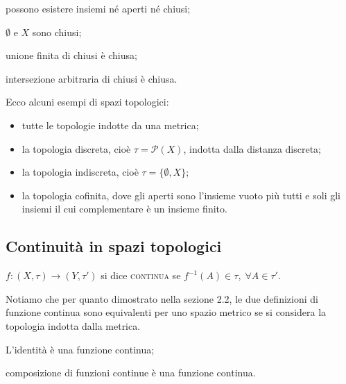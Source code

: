 \documentclass{article}
\begin{document}
\begin{oss}
\begin{nlist}
\item possono esistere insiemi né aperti né chiusi;
\item $\emptyset$ e $X$ sono chiusi;
\item unione finita di chiusi è chiusa;
\item intersezione arbitraria di chiusi è chiusa.
\end{nlist}
\end{oss}

\begin{ex}
Ecco alcuni esempi di spazi topologici:
\begin{itemize}
\item tutte le topologie indotte da una metrica;
\item la topologia discreta, cioè $\tau=\mathcal{P}(X)$, indotta dalla distanza
discreta;
\item la topologia indiscreta, cioè $\tau=\{ \emptyset, X \}$;
\item la topologia cofinita, dove gli aperti sono l'insieme vuoto più tutti e
soli gli insiemi il cui complementare è un insieme finito.
\end{itemize}
\end{ex}

\subsection{Continuità in spazi topologici}

\begin{defn}
$f: (X, \tau) \rightarrow (Y, \tau')$ si dice \textsc{continua} se ${f^{-1}(A)
\in \tau,}\; {\forall A \in \tau'}$.
\end{defn}

Notiamo che per quanto dimostrato nella sezione 2.2, le due definizioni di
funzione continua sono equivalenti per uno spazio metrico se si considera la
topologia indotta dalla metrica.

\begin{thm}
\begin{nlist}
\item L'identità è una funzione continua;
\item composizione di funzioni continue è una funzione continua.
\end{nlist}
\end{thm}
\end{document}
